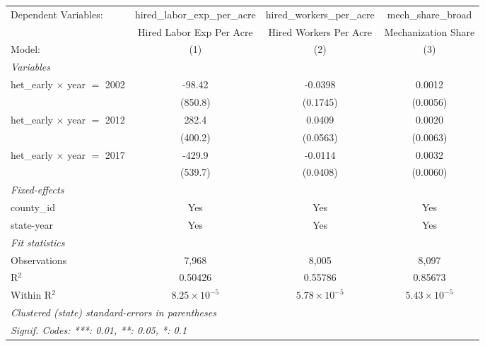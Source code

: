 
\begingroup
\centering
\begin{tabular}{lccc}
   \tabularnewline \midrule \midrule
   Dependent Variables:                & hired\_labor\_exp\_per\_acre     & hired\_workers\_per\_acre    & mech\_share\_broad\\    
                                       & Hired Labor Exp Per Acre         & Hired Workers Per Acre       & Mechanization Share \\   
   Model:                              & (1)                              & (2)                          & (3)\\  
   \midrule
   \emph{Variables}\\
   het\_early $\times$ year $=$ 2002   & -98.42                           & -0.0398                      & 0.0012\\   
                                       & (850.8)                          & (0.1745)                     & (0.0056)\\   
   het\_early $\times$ year $=$ 2012   & 282.4                            & 0.0409                       & 0.0020\\   
                                       & (400.2)                          & (0.0563)                     & (0.0063)\\   
   het\_early $\times$ year $=$ 2017   & -429.9                           & -0.0114                      & 0.0032\\   
                                       & (539.7)                          & (0.0408)                     & (0.0060)\\   
   \midrule
   \emph{Fixed-effects}\\
   county\_id                          & Yes                              & Yes                          & Yes\\  
   state-year                          & Yes                              & Yes                          & Yes\\  
   \midrule
   \emph{Fit statistics}\\
   Observations                        & 7,968                            & 8,005                        & 8,097\\  
   R$^2$                               & 0.50426                          & 0.55786                      & 0.85673\\  
   Within R$^2$                        & $8.25\times 10^{-5}$             & $5.78\times 10^{-5}$         & $5.43\times 10^{-5}$\\   
   \midrule \midrule
   \multicolumn{4}{l}{\emph{Clustered (state) standard-errors in parentheses}}\\
   \multicolumn{4}{l}{\emph{Signif. Codes: ***: 0.01, **: 0.05, *: 0.1}}\\
\end{tabular}
\par\endgroup


